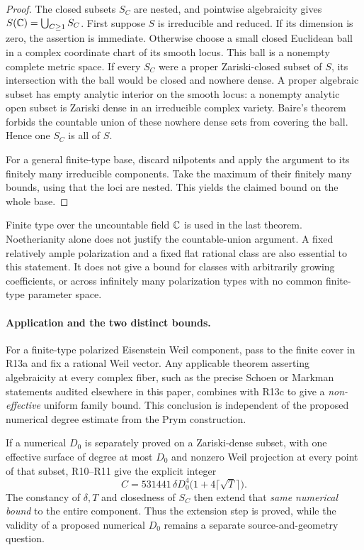 \begin{proof}
The closed subsets $S_C$ are nested, and pointwise algebraicity gives
$S(\mathbb C)=\bigcup_{C\geq1}S_C$. First suppose $S$ is irreducible and reduced.
If its dimension is zero, the assertion is immediate. Otherwise choose
a small closed Euclidean ball in a complex coordinate chart of its
smooth locus. This ball is a nonempty complete metric space. If every
$S_C$ were a proper Zariski-closed subset of $S$, its intersection with
the ball would be closed and nowhere dense. A proper algebraic subset
has empty analytic interior on the smooth locus: a nonempty analytic
open subset is Zariski dense in an irreducible complex variety. Baire's
theorem forbids the countable union of these nowhere dense sets from
covering the ball. Hence one $S_C$ is all of $S$.

For a general finite-type base, discard nilpotents and apply the argument
to its finitely many irreducible components. Take the maximum of their
finitely many bounds, using that the loci are nested. This yields the
claimed bound on the whole base.
\end{proof}

\begin{remark}
Finite type over the uncountable field $\mathbb C$ is used in the last theorem.
Noetherianity alone does not justify the countable-union argument. A
fixed relatively ample polarization and a fixed flat rational class are
also essential to this statement. It does not give a bound for classes
with arbitrarily growing coefficients, or across infinitely many
polarization types with no common finite-type parameter space.
\end{remark}

\paragraph{Application and the two distinct bounds.}
For a finite-type polarized Eisenstein Weil component, pass to the finite
cover in R13a and fix a rational Weil vector. Any applicable theorem
asserting algebraicity at every complex fiber, such as the precise
Schoen or Markman statements audited elsewhere in this paper, combines
with R13c to give a \emph{non-effective} uniform family bound. This
conclusion is independent of the proposed numerical degree estimate
from the Prym construction.

If a numerical $D_0$ is separately proved on a Zariski-dense subset,
with one effective surface of degree at most $D_0$ and nonzero Weil
projection at every point of that subset, R10--R11 give the explicit
integer
\[
 C=531441\,\delta D_0^4\bigl(1+4\lceil\sqrt T\rceil\bigr).
\]
The constancy of $\delta,T$ and closedness of $S_C$ then extend that
\emph{same numerical bound} to the entire component. Thus the extension
step is proved, while the validity of a proposed numerical $D_0$ remains
a separate source-and-geometry question.

